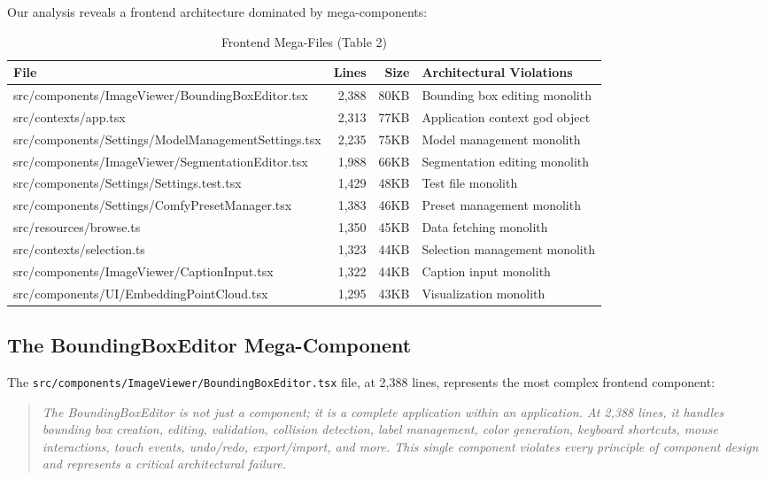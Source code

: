 \documentclass[11pt]{article}
\begin{document}
Our analysis reveals a frontend architecture dominated by mega-components:

\begin{table}[ht]
\centering
\begin{tabular}{|p{3.5cm}|r|r|p{4cm}|}
\hline
\textbf{File} & \textbf{Lines} & \textbf{Size} & \textbf{Architectural Violations} \\
\hline
src/components/ImageViewer/BoundingBoxEditor.tsx & 2,388 & 80KB & Bounding box editing monolith \\
src/contexts/app.tsx & 2,313 & 77KB & Application context god object \\
src/components/Settings/ModelManagementSettings.tsx & 2,235 & 75KB & Model management monolith \\
src/components/ImageViewer/SegmentationEditor.tsx & 1,988 & 66KB & Segmentation editing monolith \\
src/components/Settings/Settings.test.tsx & 1,429 & 48KB & Test file monolith \\
src/components/Settings/ComfyPresetManager.tsx & 1,383 & 46KB & Preset management monolith \\
src/resources/browse.ts & 1,350 & 45KB & Data fetching monolith \\
src/contexts/selection.ts & 1,323 & 44KB & Selection management monolith \\
src/components/ImageViewer/CaptionInput.tsx & 1,322 & 44KB & Caption input monolith \\
src/components/UI/EmbeddingPointCloud.tsx & 1,295 & 43KB & Visualization monolith \\
\hline
\end{tabular}
\caption{Frontend Mega-Files (Table 2)}
\end{table}

\subsection{The BoundingBoxEditor Mega-Component}

The \texttt{src/components/ImageViewer/BoundingBoxEditor.tsx} file, at 2,388 lines, represents the most complex frontend component:

\begin{quote}
\emph{The BoundingBoxEditor is not just a component; it is a complete application within an application. At 2,388 lines, it handles bounding box creation, editing, validation, collision detection, label management, color generation, keyboard shortcuts, mouse interactions, touch events, undo/redo, export/import, and more. This single component violates every principle of component design and represents a critical architectural failure.}
\end{quote}
\end{document}
